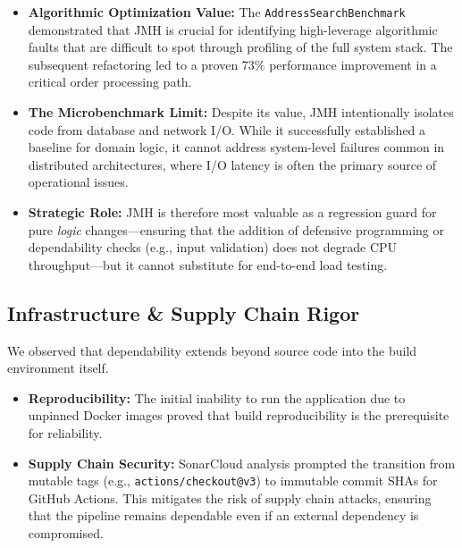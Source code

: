 \begin{itemize}
    \item \textbf{Algorithmic Optimization Value:} The \texttt{AddressSearchBenchmark} demonstrated that JMH is crucial for identifying high-leverage algorithmic faults that are difficult to spot through profiling of the full system stack. The subsequent refactoring led to a proven $73\%$ performance improvement in a critical order processing path.
    \item \textbf{The Microbenchmark Limit:} Despite its value, JMH intentionally isolates code from database and network I/O. While it successfully established a baseline for domain logic, it cannot address system-level failures common in distributed architectures, where I/O latency is often the primary source of operational issues.
    \item \textbf{Strategic Role:} JMH is therefore most valuable as a regression guard for pure \emph{logic} changes—ensuring that the addition of defensive programming or dependability checks (e.g., input validation) does not degrade CPU throughput—but it cannot substitute for end-to-end load testing.
\end{itemize}

\subsection{Infrastructure \& Supply Chain Rigor}
We observed that dependability extends beyond source code into the build environment itself.
\begin{itemize}
    \item \textbf{Reproducibility:} The initial inability to run the application due to unpinned Docker images proved that build reproducibility is the prerequisite for reliability.
    \item \textbf{Supply Chain Security:} SonarCloud analysis prompted the transition from mutable tags (e.g., \texttt{actions/checkout@v3}) to immutable commit SHAs for GitHub Actions. This mitigates the risk of supply chain attacks, ensuring that the pipeline remains dependable even if an external dependency is compromised.
\end{itemize}

